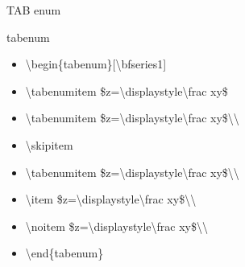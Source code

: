 \documentclass[ aspectratio=149,  10pt,blue,xcolor=pdftex,dvipsnames,table,handout,notes]{beamer}
\begin{document}
		\begin{frame}[t]{TAB enum}

		\begin{block}{tabenum}
		\begin{itemize}
		\item[]	\textbackslash begin\{tabenum\}[\textbackslash bfseries1]
		\item[]	\textbackslash tabenumitem 		\$z=\textbackslash displaystyle\textbackslash frac xy\$
		\item[]	\textbackslash tabenumitem 		\$z=\textbackslash displaystyle\textbackslash frac xy\$\textbackslash\textbackslash 
		\item[]	\textbackslash skipitem
		\item[]	\textbackslash tabenumitem 		\$z=\textbackslash displaystyle\textbackslash frac xy\$\textbackslash\textbackslash 
		\item[]	\textbackslash item 			\$z=\textbackslash displaystyle\textbackslash frac xy\$\textbackslash\textbackslash 
		\item[]	\textbackslash noitem 			\$z=\textbackslash displaystyle\textbackslash frac xy\$\textbackslash\textbackslash 
		\item[]	\textbackslash end\{tabenum\}
		\end{itemize}
		\end{block}

		\end{frame}
\end{document}
